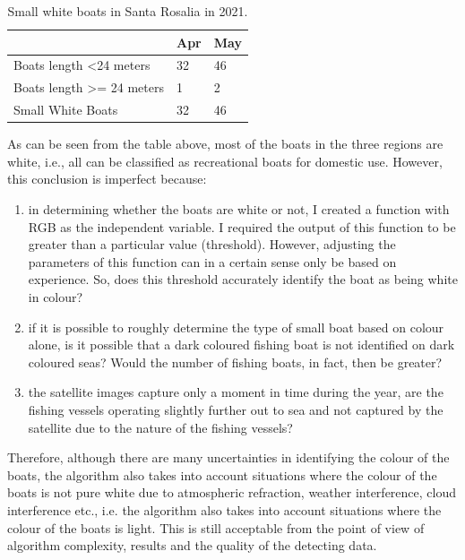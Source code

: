 \begin{table}[h!]
\begin{tabular}{|l|l|l|}
\hline
                                       & Apr & May \\ \hline
Boats length \textless 24 meters       & 32  & 46  \\ \hline
Boats length \textgreater{}= 24 meters & 1   & 2   \\ \hline
Small White Boats                      & 32  & 46  \\ \hline
\end{tabular}
\caption{Small white boats in Santa Rosalia in 2021.}
\end{table}



As can be seen from the table above, most of the boats in the three regions are white, i.e., all can be classified as recreational boats for domestic use. However, this conclusion is imperfect because:

\begin{enumerate}
    \item in determining whether the boats are white or not, I created a function with RGB as the independent variable. I required the output of this function to be greater than a particular value (threshold). However, adjusting the parameters of this function can in a certain sense only be based on experience. So, does this threshold accurately identify the boat as being white in colour?
    
    \item if it is possible to roughly determine the type of small boat based on colour alone, is it possible that a dark coloured fishing boat is not identified on dark coloured seas? Would the number of fishing boats, in fact, then be greater?
    
    \item the satellite images capture only a moment in time during the year, are the fishing vessels operating slightly further out to sea and not captured by the satellite due to the nature of the fishing vessels?
\end{enumerate}

Therefore, although there are many uncertainties in identifying the colour of the boats, the algorithm also takes into account situations where the colour of the boats is not pure white due to atmospheric refraction, weather interference, cloud interference etc., i.e. the algorithm also takes into account situations where the colour of the boats is light. This is still acceptable from the point of view of algorithm complexity, results and the quality of the detecting data.